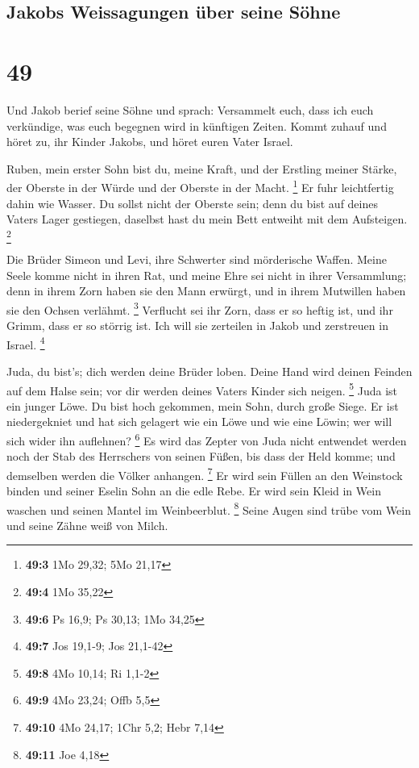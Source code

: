 \hypertarget{jakobs-weissagungen-uxfcber-seine-suxf6hne}{%
\subsection{Jakobs Weissagungen über seine
Söhne}\label{jakobs-weissagungen-uxfcber-seine-suxf6hne}}

\hypertarget{section-48}{%
\section{49}\label{section-48}}

 Und Jakob berief seine Söhne und sprach: Versammelt euch,
dass ich euch verkündige, was euch begegnen wird in künftigen Zeiten.
 Kommt zuhauf und höret zu, ihr Kinder Jakobs, und höret
euren Vater Israel.

 Ruben, mein erster Sohn bist du, meine Kraft, und der
Erstling meiner Stärke, der Oberste in der Würde und der Oberste in der
Macht. \footnote{\textbf{49:3} 1Mo 29,32; 5Mo 21,17}  Er
fuhr leichtfertig dahin wie Wasser. Du sollst nicht der Oberste sein;
denn du bist auf deines Vaters Lager gestiegen, daselbst hast du mein
Bett entweiht mit dem Aufsteigen. \footnote{\textbf{49:4} 1Mo 35,22}

 Die Brüder Simeon und Levi, ihre Schwerter sind
mörderische Waffen.  Meine Seele komme nicht in ihren Rat,
und meine Ehre sei nicht in ihrer Versammlung; denn in ihrem Zorn haben
sie den Mann erwürgt, und in ihrem Mutwillen haben sie den Ochsen
verlähmt. \footnote{\textbf{49:6} Ps 16,9; Ps 30,13; 1Mo 34,25}
 Verflucht sei ihr Zorn, dass er so heftig ist, und ihr
Grimm, dass er so störrig ist. Ich will sie zerteilen in Jakob und
zerstreuen in Israel. \footnote{\textbf{49:7} Jos 19,1-9; Jos 21,1-42}

 Juda, du bist's; dich werden deine Brüder loben. Deine
Hand wird deinen Feinden auf dem Halse sein; vor dir werden deines
Vaters Kinder sich neigen. \footnote{\textbf{49:8} 4Mo 10,14; Ri 1,1-2}
 Juda ist ein junger Löwe. Du bist hoch gekommen, mein
Sohn, durch große Siege. Er ist niedergekniet und hat sich gelagert wie
ein Löwe und wie eine Löwin; wer will sich wider ihn auflehnen?
\footnote{\textbf{49:9} 4Mo 23,24; Offb 5,5}  Es wird das
Zepter von Juda nicht entwendet werden noch der Stab des Herrschers von
seinen Füßen, bis dass der Held komme; und demselben werden die Völker
anhangen. \footnote{\textbf{49:10} 4Mo 24,17; 1Chr 5,2; Hebr 7,14}
 Er wird sein Füllen an den Weinstock binden und seiner
Eselin Sohn an die edle Rebe. Er wird sein Kleid in Wein waschen und
seinen Mantel im Weinbeerblut. \footnote{\textbf{49:11} Joe 4,18}
 Seine Augen sind trübe vom Wein und seine Zähne weiß von
Milch.

